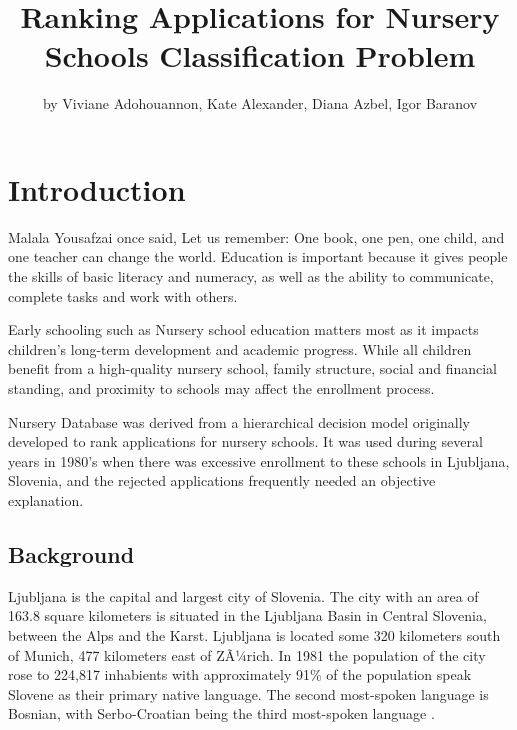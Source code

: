 \title{Ranking Applications for Nursery Schools Classification Problem}
\author{by Viviane Adohouannon, Kate Alexander, Diana Azbel, Igor Baranov}

\maketitle



\hypertarget{introduction}{%
\section{Introduction}\label{introduction}}

Malala Yousafzai once said, Let us remember: One book, one pen, one
child, and one teacher can change the world. Education is important
because it gives people the skills of basic literacy and numeracy, as
well as the ability to communicate, complete tasks and work with others.

Early schooling such as Nursery school education matters most as it
impacts children's long-term development and academic progress. While
all children benefit from a high-quality nursery school, family
structure, social and financial standing, and proximity to schools may
affect the enrollment process.

Nursery Database \citep{noauthor_uci_nodate} was derived from a
hierarchical decision model originally developed to rank applications
for nursery schools. It was used during several years in 1980's when
there was excessive enrollment to these schools in Ljubljana, Slovenia,
and the rejected applications frequently needed an objective
explanation.

\hypertarget{background}{%
\subsection{Background}\label{background}}

Ljubljana is the capital and largest city of Slovenia. The city with an
area of 163.8 square kilometers is situated in the Ljubljana Basin in
Central Slovenia, between the Alps and the Karst. Ljubljana is located
some 320 kilometers south of Munich, 477 kilometers east of ZÃ¼rich. In
1981 the population of the city rose to 224,817 inhabients with
approximately 91\% of the population speak Slovene as their primary
native language. The second most-spoken language is Bosnian, with
Serbo-Croatian being the third most-spoken language
\citep{noauthor_ljubljana_2018}.

